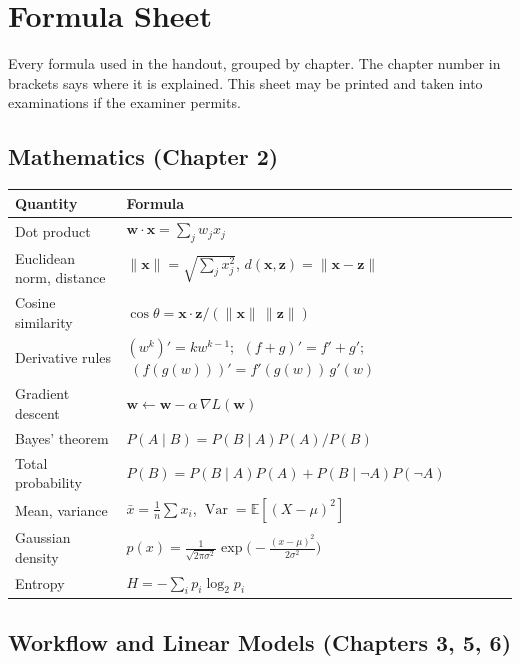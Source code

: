 \chapter{Formula Sheet}\label{app:formulas}
\normalfigures

Every formula used in the handout, grouped by chapter. The chapter number in brackets
says where it is explained. This sheet may be printed and taken into examinations if
the examiner permits.

\section{Mathematics (Chapter 2)}

\begin{longtable}{@{}L{4.0cm}L{11.0cm}@{}}
\toprule
{}
\textbf{Quantity} & \textbf{Formula} \\
\midrule
\endhead
Dot product & $\mathbf{w}\cdot\mathbf{x} = \sum_j w_j x_j$ \\
Euclidean norm, distance & $\|\mathbf{x}\| = \sqrt{\sum_j x_j^2}$, \quad $d(\mathbf{x}, \mathbf{z}) = \|\mathbf{x} - \mathbf{z}\|$ \\
Cosine similarity & $\cos\theta = \mathbf{x}\cdot\mathbf{z} / (\|\mathbf{x}\|\,\|\mathbf{z}\|)$ \\
Derivative rules & $(w^k)' = k w^{k-1}$; $\;(f + g)' = f' + g'$; $\;(f(g(w)))' = f'(g(w))\,g'(w)$ \\
Gradient descent & $\mathbf{w} \leftarrow \mathbf{w} - \alpha\,\nabla L(\mathbf{w})$ \\
Bayes' theorem & $P(A \mid B) = P(B \mid A)P(A) / P(B)$ \\
Total probability & $P(B) = P(B \mid A)P(A) + P(B \mid \neg A)P(\neg A)$ \\
Mean, variance & $\bar{x} = \tfrac{1}{n}\sum x_i$, \quad $\operatorname{Var} = \mathbb{E}[(X - \mu)^2]$ \\
Gaussian density & $p(x) = \frac{1}{\sqrt{2\pi\sigma^2}}\exp\!\big(-\frac{(x-\mu)^2}{2\sigma^2}\big)$ \\
Entropy & $H = -\sum_i p_i\log_2 p_i$ \\
\bottomrule
\end{longtable}

\section{Workflow and Linear Models (Chapters 3, 5, 6)}

